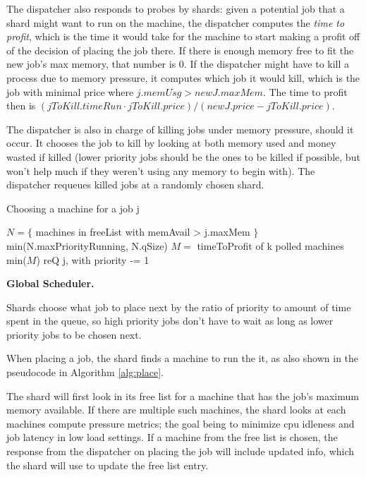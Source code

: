 The dispatcher also responds to probes by shards: given a potential job that a
shard might want to run on the machine, the dispatcher computes the \textit{time
to profit}, which is the time it would take for the machine to start making a
profit off of the decision of placing the job there. If there is enough memory
free to fit the new job's max memory, that number is 0. If the dispatcher might
have to kill a process due to memory pressure, it computes which job it would
kill, which is the job with minimal price where $j.memUsg > newJ.maxMem$. The
time to profit then is $(jToKill.timeRun \cdot jToKill.price) / (newJ.price
- jToKill.price)$.

The dispatcher is also in charge of killing jobs under memory pressure, should
it occur. It chooses the job to kill by looking at both memory used and money
wasted if killed (lower priority jobs should be the ones to be killed if
possible, but won't help much if they weren't using any memory to begin with).
The dispatcher requeues killed jobs at a randomly chosen shard.


\begin{algorithm}[t]
\caption{Choosing a machine for a job j}\label{alg:place}
\begin{algorithmic}
    \State$N = \{ $ machines in freeList with memAvail > j.maxMem $\}$
     \\
        \Return$ $min(N.maxPriorityRunning, N.qSize)
    \EndIf
    \State$M = $ timeToProfit of k polled machines
     \\
        \Return$ $min($M$)
    \Else
        \State$ $reQ j, with priority -= 1
    \EndIf
\end{algorithmic}
\end{algorithm}


\textbf{Global Scheduler.}

Shards choose what job to place next by the ratio of priority to amount of time
spent in the queue, so high priority jobs don't have to wait as long as lower
priority jobs to be chosen next.

When placing a job, the shard finds a machine to run the it, as also shown in
the pseudocode in Algorithm \ref{alg:place}. 

The shard will first look in its free list for a machine that has the job's
maximum memory available. If there are multiple such machines, the shard looks
at each machines compute pressure metrics; the goal being to minimize cpu
idleness and job latency in low load settings. If a machine from the free list is chosen, the
response from the dispatcher on placing the job will include updated info,
which the shard will use to update the free list entry.


